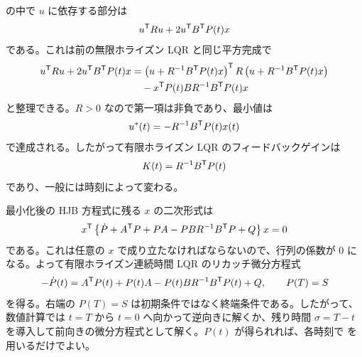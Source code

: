  の中で $u$ に依存する部分は
\begin{equation}
  u^{\mathsf{T}} Ru+2u^{\mathsf{T}} B^{\mathsf{T}} P(t)x
\end{equation}
である。これは前の無限ホライズン LQR と同じ平方完成で
\begin{align}
  u^{\mathsf{T}} Ru+2u^{\mathsf{T}} B^{\mathsf{T}} P(t)x
  &=
  \left(u+R^{-1}B^{\mathsf{T}} P(t)x\right)^{\mathsf{T}}
  R
  \left(u+R^{-1}B^{\mathsf{T}} P(t)x\right)\\
  &\quad
  -x^{\mathsf{T}} P(t)BR^{-1}B^{\mathsf{T}} P(t)x
\end{align}
と整理できる。$R>0$ なので第一項は非負であり、最小値は
\begin{equation}
  u^*(t)=-R^{-1}B^{\mathsf{T}} P(t)x(t)
  \label{eq:finite-lqr-control}
\end{equation}
で達成される。したがって有限ホライズン LQR のフィードバックゲインは
\begin{equation}
  K(t)=R^{-1}B^{\mathsf{T}} P(t)
  \label{eq:finite-lqr-gain}
\end{equation}
であり、一般には時刻によって変わる。

最小化後の HJB 方程式に残る $x$ の二次形式は
\begin{equation}
  x^{\mathsf{T}}
  \left\{
    \dot{P}
    +A^{\mathsf{T}} P+PA
    -PBR^{-1}B^{\mathsf{T}} P
    +Q
  \right\}
  x=0
\end{equation}
である。これは任意の $x$ で成り立たなければならないので、行列の係数が 0 になる。よって有限ホライズン連続時間 LQR のリカッチ微分方程式
\begin{equation}
  -\dot{P}(t)
  =
  A^{\mathsf{T}} P(t)+P(t)A
  -P(t)BR^{-1}B^{\mathsf{T}} P(t)
  +Q,
  \qquad P(T)=S
  \label{eq:finite-lqr-rde}
\end{equation}
を得る。右端の $P(T)=S$ は初期条件ではなく終端条件である。したがって、数値計算では $t=T$ から $t=0$ へ向かって逆向きに解くか、残り時間 $\sigma=T-t$ を導入して前向きの微分方程式として解く。$P(t)$ が得られれば、各時刻で  を用いるだけでよい。

